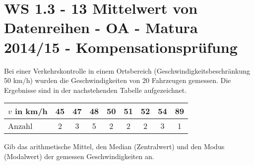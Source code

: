 \section{WS 1.3 - 13 Mittelwert von Datenreihen - OA - Matura 2014/15 - Kompensationsprüfung}

\begin{beispiel}[WS 1.3]{1} %
				Bei einer Verkehrskontrolle in einem Ortsbereich (Geschwindigkeitsbeschränkung 50 km/h) wurden die Geschwindigkeiten von 20 Fahrzeugen gemessen. Die Ergebnisse sind in der nachstehenden Tabelle aufgezeichnet.
				\begin{center}
				\begin{tabular}{|l|c|c|c|c|c|c|c|c|}\hline
								$v$ in km/h&45&47&48&50&51&52&54&89\\ \hline
				Anzahl&2&3&5&2&2&2&3&1\\ \hline
				\end{tabular}
\end{center}

Gib das arithmetische Mittel, den Median (Zentralwert) und den Modus (Modalwert) der gemessen Geschwindigkeiten an.\\

\end{beispiel}